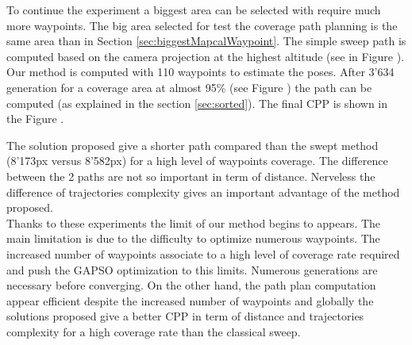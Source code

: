To continue the experiment a biggest area can be selected with require much more waypoints. The big area selected for test the coverage path planning is the same area than in Section \ref{sec:biggestMapcalWaypoint}. 
The simple sweep path is computed based on the camera projection at the highest altitude (see in Figure ). Our method is computed  with 110 waypoints to estimate the poses. After 3'634 generation for a coverage area at almost 95\% (see Figure ) the path  can be computed (as explained in the section \ref{sec:sorted}).  The final CPP is shown in the Figure . 

The solution proposed give a shorter path compared than the swept method (8'173px versus 8'582px) for a high level of waypoints coverage. The difference between the 2 paths are not so important  %
in term of distance. Nerveless the difference of trajectories complexity gives an important advantage of the method proposed.\\
Thanks to these experiments the limit of our method begins to appears. The main limitation is due to the difficulty to optimize numerous waypoints. %
 The increased number of waypoints associate to a high level of coverage rate required and push the GAPSO optimization to this limits. Numerous generations are necessary before converging. On the other hand, the path plan computation appear efficient despite the increased number of waypoints and globally the solutions proposed give a better CPP in term of distance and trajectories complexity for a high coverage rate than the classical sweep.


 
 
